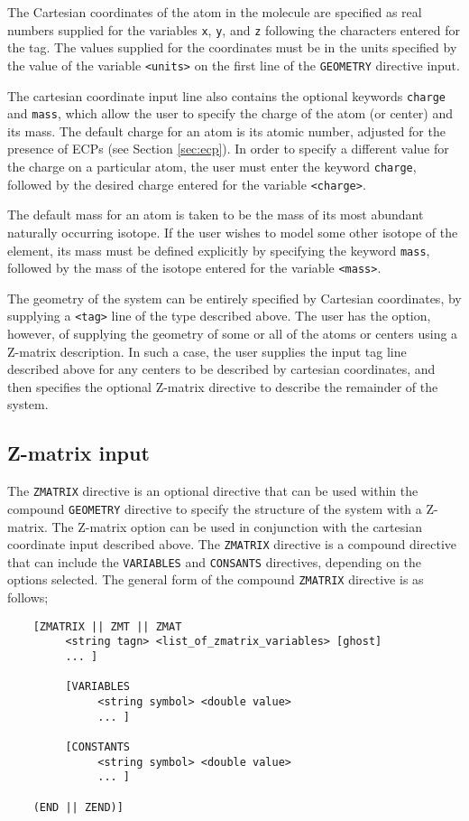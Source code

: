 The Cartesian coordinates of the atom in the molecule are specified as
real numbers supplied for the variables \verb+x+, \verb+y+, and \verb+z+
following the characters entered for the tag.
The values supplied for the coordinates must be in the units specified
by the value of the variable \verb+<units>+ on the first line of
the \verb+GEOMETRY+ directive input.

The cartesian coordinate input line also contains
the optional keywords \verb+charge+ and \verb+mass+, which allow
the user to specify the charge of the atom (or center) and its mass.
The default charge for an atom is its atomic number, adjusted for the
presence of ECPs (see Section \ref{sec:ecp}).  In order to specify a
different value for the charge on a particular atom, the user must
enter the keyword \verb+charge+, followed by the desired charge entered
for the variable \verb+<charge>+.

The default mass for an atom is taken to be the mass of its most abundant
naturally occurring isotope.  If the user wishes to model some other
isotope of the element, its mass must be defined explicitly by
specifying the keyword \verb+mass+, followed by the mass of the isotope
entered for the variable \verb+<mass>+.

The geometry of the system can be entirely specified by Cartesian coordinates,
by supplying a \verb+<tag>+ line of the type described above.  The user has
the option, however, of supplying the geometry of some or all of the atoms 
or centers using a Z-matrix description.  In such a case, the user supplies
the input tag line described above for any centers 
to be described by cartesian coordinates, and then specifies the optional
Z-matrix directive to describe the remainder of the system.

\subsection{Z-matrix input}
\label{sec:Z-matrix}

The \verb+ZMATRIX+ directive is an optional directive that can be used within
the compound \verb+GEOMETRY+ directive to specify the structure of the system with a
Z-matrix.  The Z-matrix option can be used in conjunction with the cartesian
coordinate input described above.  The \verb+ZMATRIX+ directive is a compound
directive that can include the \verb+VARIABLES+ and \verb+CONSANTS+
directives, depending on the options selected.  The general form of the 
compound \verb+ZMATRIX+ 
directive is as follows;
\begin{verbatim}
    [ZMATRIX || ZMT || ZMAT
         <string tagn> <list_of_zmatrix_variables> [ghost]
         ... ]

         [VARIABLES
              <string symbol> <double value>
              ... ]
 
         [CONSTANTS
              <string symbol> <double value>
              ... ]

    (END || ZEND)]
\end{verbatim}

